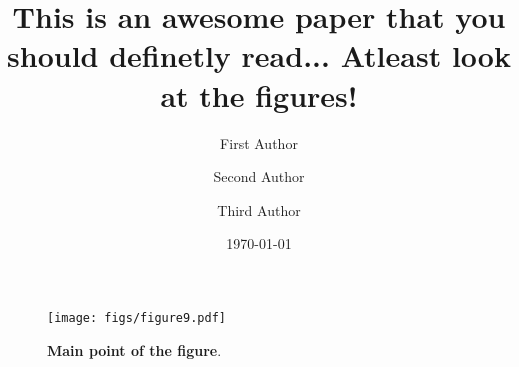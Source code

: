 \documentclass[aps,prl,twocolumn,longbibliography,superscriptaddress]{revtex4-2}
\begin{document}
\title{This is an awesome paper that you should definetly read... Atleast look at the figures!}

\author{First Author}
\author{Second Author}
\author{Third Author}

\date{\today}
\begin{abstract}
    \blindtext
\end{abstract}

\maketitle












\blindtext[2]

\begin{figure}[t!]
    \texttt{[image: figs/figure9.pdf]}
    \caption{
        {\bf Main point of the figure}.
        \blindtext
    }
    \label{fig:Ic}
\end{figure}


\blinddocument

\clearpage
\end{document}
